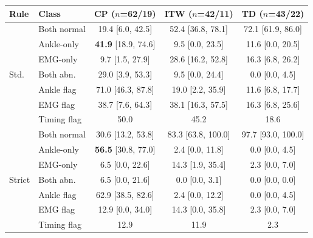 \begin{tabular}{llccc}
\toprule
Rule & Class & CP ($n$=62/19) & ITW ($n$=42/11) & TD ($n$=43/22) \\
\midrule
\multirow{7}{*}{Std.} & Both normal & 19.4 [6.0, 42.5] & 52.4 [36.8, 78.1] & 72.1 [61.9, 86.0] \\
 & Ankle-only & \textbf{41.9} [18.9, 74.6] & 9.5 [0.0, 23.5] & 11.6 [0.0, 20.5] \\
 & EMG-only & 9.7 [1.5, 27.9] & 28.6 [16.2, 52.8] & 16.3 [6.8, 26.2] \\
 & Both abn. & 29.0 [3.9, 53.3] & 9.5 [0.0, 24.4] & 0.0 [0.0, 4.5] \\
\cmidrule(l){2-5}
 & Ankle flag & 71.0 [46.3, 87.8] & 19.0 [2.2, 35.9] & 11.6 [6.8, 17.7] \\
 & EMG flag & 38.7 [7.6, 64.3] & 38.1 [16.3, 57.5] & 16.3 [6.8, 25.6] \\
 & Timing flag & 50.0 & 45.2 & 18.6 \\
\midrule
\multirow{7}{*}{Strict} & Both normal & 30.6 [13.2, 53.8] & 83.3 [63.8, 100.0] & 97.7 [93.0, 100.0] \\
 & Ankle-only & \textbf{56.5} [30.8, 77.0] & 2.4 [0.0, 11.8] & 0.0 [0.0, 4.5] \\
 & EMG-only & 6.5 [0.0, 22.6] & 14.3 [1.9, 35.4] & 2.3 [0.0, 7.0] \\
 & Both abn. & 6.5 [0.0, 21.6] & 0.0 [0.0, 3.1] & 0.0 [0.0, 0.0] \\
\cmidrule(l){2-5}
 & Ankle flag & 62.9 [38.5, 82.6] & 2.4 [0.0, 12.2] & 0.0 [0.0, 4.5] \\
 & EMG flag & 12.9 [0.0, 34.0] & 14.3 [0.0, 35.8] & 2.3 [0.0, 7.0] \\
 & Timing flag & 12.9 & 11.9 & 2.3 \\
\bottomrule
\end{tabular}
